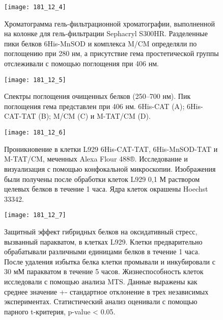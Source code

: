 \begin{figure}[H]
	\centering
	\texttt{[image: 181\_12\_4]}
	\caption{Хроматограмма гель-фильтрационной хроматографии, выполненной на колонке для гель-фильтрации Sephacryl S300HR. Разделенные пики белков 6His-MnSOD и комплекса M/CM определяли по поглощению при 280 нм, а присутствие гема простетической группы отслеживали с помощью поглощения при 406 нм.}
	\label{fig:181_12_4}		
\end{figure}

\begin{figure}[H]
	\centering
	\texttt{[image: 181\_12\_5]}
	\caption{Спектры поглощения очищенных белков (250–700 нм). Пик поглощения гема представлен при 406 нм. 6His-CAT (A); 6His-CAT-TAT (B); M/CM (C) и M-TAT/CM (D).}
	\label{fig:181_12_5}		
\end{figure}


\begin{figure}[H]
	\centering
	\texttt{[image: 181\_12\_6]}
	\caption{Проникновение в клетки L929 6His-CAT-TAT, 6His-MnSOD-TAT и M-TAT/CM, меченных Alexa Flour 488®. Исследование и визуализация с помощью конфокальной микроскопии. Изображения были получены после обработки клеток L929 0,1 М раствором целевых белков в течение 1 часа. Ядра клеток окрашены Hoechst 33342.}
	\label{fig:181_12_6}		
\end{figure}

\begin{figure}[H]
	\centering
	\texttt{[image: 181\_12\_7]}
	\caption{Защитный эффект гибридных белков на оксидативный стресс, вызванный паракватом, в клетках L929. Клетки предварительно обрабатывали различными единицами белков в течение 1 часа. После удаления избытка белка клетки промывали и инкубировали с 30 мМ паракватом в течение 5 часов. Жизнеспособность клеток исследовали с помощью анализа MTS. Данные выражены как среднее значение +- стандартное отклонение в трех независимых экспериментах. Статистический анализ оценивали с помощью парного t-критерия, p-value < 0.05.}
	\label{fig:181_12_7}		
\end{figure}